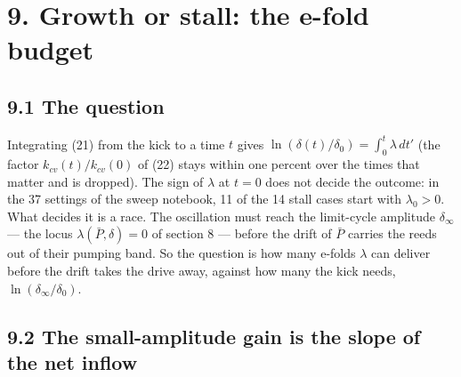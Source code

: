 \documentclass[11pt]{article}
\begin{document}
\section*{9. Growth or stall: the e-fold budget}

\subsection*{9.1 The question}

Integrating (21) from the kick to a time $t$ gives $\ln\left(\delta(t)/\delta_0\right) = \int_0^t \lambda\,dt'$ (the factor $k_{cv}(t)/k_{cv}(0)$ of (22) stays within one percent over the times that matter and is dropped). The sign of $\lambda$ at $t = 0$ does not decide the outcome: in the 37 settings of the sweep notebook, 11 of the 14 stall cases start with $\lambda_0 > 0$. What decides it is a race. The oscillation must reach the limit-cycle amplitude $\delta_\infty$ --- the locus $\lambda(\bar P, \delta) = 0$ of section 8 --- before the drift of $\bar P$ carries the reeds out of their pumping band. So the question is how many e-folds $\lambda$ can deliver before the drift takes the drive away, against how many the kick needs, $\ln(\delta_\infty/\delta_0)$.

\subsection*{9.2 The small-amplitude gain is the slope of the net inflow}
\end{document}
